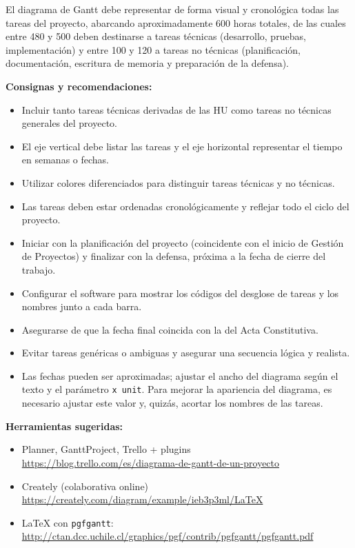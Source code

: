\documentclass[
11pt, %
]{charter}
\begin{document}
El diagrama de Gantt debe representar de forma visual y cronológica todas las tareas del proyecto, abarcando aproximadamente 600 horas totales, de las cuales entre 480 y 500 deben destinarse a tareas técnicas (desarrollo, pruebas, implementación) y entre 100 y 120 a tareas no técnicas (planificación, documentación, escritura de memoria y preparación de la defensa).

\textbf{Consignas y recomendaciones:}
\begin{itemize}
  \item Incluir tanto tareas técnicas derivadas de las HU como tareas no técnicas generales del proyecto.
  \item El eje vertical debe listar las tareas y el eje horizontal representar el tiempo en semanas o fechas.
  \item Utilizar colores diferenciados para distinguir tareas técnicas y no técnicas.
  \item Las tareas deben estar ordenadas cronológicamente y reflejar todo el ciclo del proyecto.
  \item Iniciar con la planificación del proyecto (coincidente con el inicio de Gestión de Proyectos) y finalizar con la defensa, próxima a la fecha de cierre del trabajo.
  \item Configurar el software para mostrar los códigos del desglose de tareas y los nombres junto a cada barra.
  \item Asegurarse de que la fecha final coincida con la del Acta Constitutiva.
  \item Evitar tareas genéricas o ambiguas y asegurar una secuencia lógica y realista.
  \item Las fechas pueden ser aproximadas; ajustar el ancho del diagrama según el texto y el parámetro \texttt{x unit}. Para mejorar la apariencia del diagrama, es necesario ajustar este valor y, quizás, acortar los nombres de las tareas.
\end{itemize}

\textbf{Herramientas sugeridas:}
\begin{itemize}
  \item Planner, GanttProject, Trello + plugins\\
  \url{https://blog.trello.com/es/diagrama-de-gantt-de-un-proyecto}
  \item Creately (colaborativa online)\\
  \url{https://creately.com/diagram/example/ieb3p3ml/LaTeX}
  \item LaTeX con \texttt{pgfgantt}:\\
  \url{http://ctan.dcc.uchile.cl/graphics/pgf/contrib/pgfgantt/pgfgantt.pdf}
\end{itemize}
\end{document}
